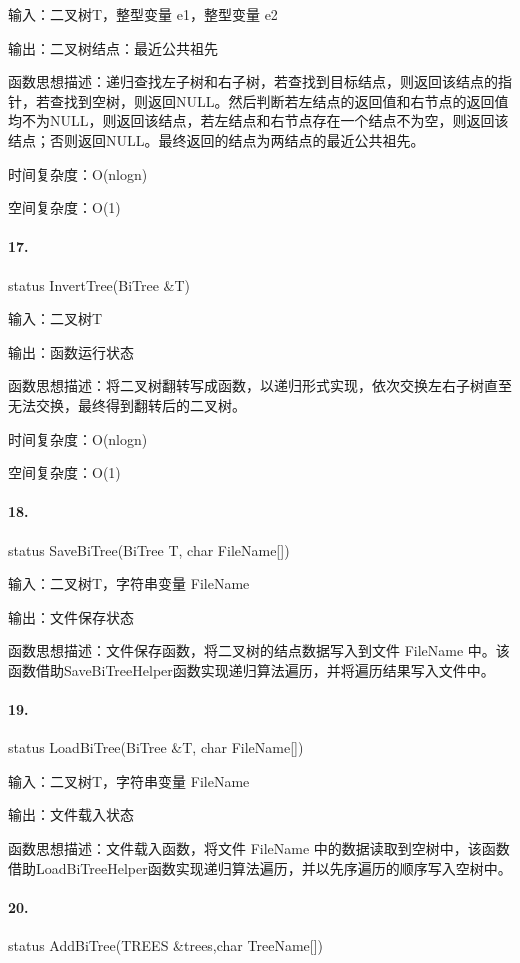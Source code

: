 \documentclass[supercite]{Experimental_Report}
\theoremstyle{definition}
\begin{document}
输入：二叉树T，整型变量 e1，整型变量 e2

输出：二叉树结点：最近公共祖先

函数思想描述：递归查找左子树和右子树，若查找到目标结点，则返回该结点的指针，若查找到空树，则返回NULL。然后判断若左结点的返回值和右节点的返回值均不为NULL，则返回该结点，若左结点和右节点存在一个结点不为空，则返回该结点；否则返回NULL。最终返回的结点为两结点的最近公共祖先。

时间复杂度：O(nlogn)

空间复杂度：O(1)

\paragraph{17.}status InvertTree(BiTree \&T)

输入：二叉树T

输出：函数运行状态

函数思想描述：将二叉树翻转写成函数，以递归形式实现，依次交换左右子树直至无法交换，最终得到翻转后的二叉树。

时间复杂度：O(nlogn)

空间复杂度：O(1)

\paragraph{18.}status SaveBiTree(BiTree T, char FileName[])

输入：二叉树T，字符串变量 FileName

输出：文件保存状态

函数思想描述：文件保存函数，将二叉树的结点数据写入到文件 FileName 中。该函数借助SaveBiTreeHelper函数实现递归算法遍历，并将遍历结果写入文件中。

\paragraph{19.}status LoadBiTree(BiTree \&T,  char FileName[])

输入：二叉树T，字符串变量 FileName

输出：文件载入状态

函数思想描述：文件载入函数，将文件 FileName 中的数据读取到空树中，该函数借助LoadBiTreeHelper函数实现递归算法遍历，并以先序遍历的顺序写入空树中。

\paragraph{20.}status AddBiTree(TREES \&trees,char TreeName[])
\end{document}
